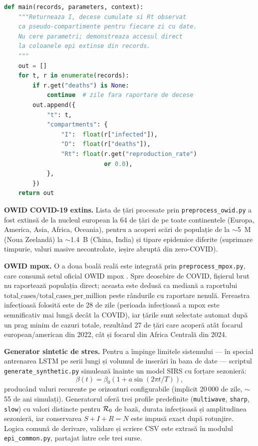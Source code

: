 \begin{lstlisting}[language=Python, label={lst:script_owid_richer}, caption={Script user (executor partajat \texttt{runner-script}) care folosește coloanele epi extinse: raportează $I$, decese cumulate și $R_t$ observat ca pseudo-compartimente.}]
def main(records, parameters, context):
    """Returneaza I, decese cumulate si Rt observat
    ca pseudo-compartimente pentru fiecare zi cu date.
    Nu cere parametri; demonstreaza accesul direct
    la coloanele epi extinse din records.
    """
    out = []
    for t, r in enumerate(records):
        if r.get("deaths") is None:
            continue  # zile fara raportare de decese
        out.append({
            "t": t,
            "compartments": {
                "I":  float(r["infected"]),
                "D":  float(r["deaths"]),
                "Rt": float(r.get("reproduction_rate")
                            or 0.0),
            },
        })
    return out
\end{lstlisting}

\textbf{OWID COVID-19 extins.} Lista de țări procesate prin
\texttt{preprocess\_owid.py} a fost extinsă de la nucleul european la 64 de țări
de pe toate continentele (Europa, America, Asia, Africa, Oceania), pentru a
acoperi scări de populație de la $\sim$5~M (Noua Zeelandă) la $\sim$1.4~B
(China, India) și tipare epidemice diferite (suprimare timpurie, valuri masive
necontrolate, ieșire abruptă din zero-COVID).

\textbf{OWID mpox.} O a doua boală reală este integrată prin
\texttt{preprocess\_mpox.py}, care consumă setul oficial OWID mpox
\cite{owid_covid}. Spre deosebire de COVID, fișierul brut nu raportează
populația direct; aceasta este dedusă ca mediană a raportului
$\text{total\_cases}/\text{total\_cases\_per\_million}$ peste rândurile cu
raportare nenulă. Fereastra infecțioasă folosită este de 28 de zile (perioada
infecțioasă a mpox este semnificativ mai lungă decât la COVID), iar țările sunt
selectate automat după un prag minim de cazuri totale, rezultând 27 de țări care
acoperă atât focarul european/american din 2022, cât și focarul din Africa
Centrală din 2024.

\textbf{Generator sintetic de stres.} Pentru a împinge limitele sistemului ---
în special antrenarea LSTM pe serii lungi și volumul de inserări în baza de
date --- scriptul \texttt{generate\_synthetic.py} simulează înainte un model
SIRS cu forțare sezonieră:
\begin{equation}
\beta(t) = \beta_0 \left(1 + a \sin\!\left(2\pi t / T\right)\right),
\end{equation}
producând valuri recurente pe orizonturi configurabile (implicit 20\,000 de
zile, $\sim$55 de ani simulați). Generatorul oferă trei profile predefinite
(\texttt{multiwave}, \texttt{sharp}, \texttt{slow}) cu valori distincte pentru
$\mathcal{R}_0$ de bază, durata infecțioasă și amplitudinea sezonieră, iar conservarea
$S+I+R=N$ este impusă exact după rotunjire. Logica comună de derivare,
validare și scriere CSV este extrasă în modulul \texttt{epi\_common.py}, partajat
între cele trei surse.


